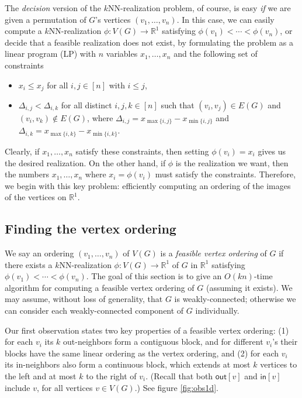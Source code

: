 \documentclass[english]{lipics-v2021}
\begin{document}
The \emph{decision} version of the $k$NN-realization problem, of course, is easy \emph{if} we are given a permutation of $G$'s vertices $(v_1,\dots,v_n)$. In this case, we can easily compute a $k$NN-realization $\phi: V(G) \rightarrow \mathbb{R}^1$ satisfying $\phi(v_1) < \cdots < \phi(v_n)$, or decide that a feasible realization does not exist, by formulating the  problem as a linear program (LP) with $n$ variables $x_1,\dots,x_n$ and the following set of constraints
\begin{itemize}
    \item $x_i \leq x_j$ for all $i,j \in [n]$ with $i \leq j$,
    \item $\Delta_{i,j} < \Delta_{i,k}$ for all distinct $i,j,k \in [n]$ such that $(v_i,v_j) \in E(G)$ and $(v_i,v_k) \notin E(G)$, where $\Delta_{i,j} = x_{\max\{i,j\}} - x_{\min\{i,j\}}$ and $\Delta_{i,k} = x_{\max\{i,k\}} - x_{\min\{i,k\}}$.
\end{itemize}
%
Clearly, if $x_1,\dots,x_n$ satisfy these constraints, then setting $\phi(v_i) = x_i$ gives us the desired realization.
On the other hand, if $\phi$ is the realization we want, then the numbers $x_1,\dots,x_n$ where $x_i = \phi(v_i)$ must satisfy the constraints.
Therefore, we begin with this key problem: efficiently computing an ordering of the images of the vertices on $\mathbb{R}^1$.

\subsection{Finding the vertex ordering}

We say an ordering $(v_1,\dots,v_n)$ of $V(G)$ is a \textit{feasible vertex ordering} of $G$ if there exists a $k$NN-realization $\phi: V(G) \rightarrow \mathbb{R}^1$ of $G$ in $\mathbb{R}^1$ satisfying $\phi(v_1) < \cdots < \phi(v_n)$.
The goal of this section is to give an $O(kn)$-time algorithm for computing a feasible vertex ordering of $G$ (assuming it exists).
We may assume, without loss of generality, that $G$ is weakly-connected; otherwise we can consider each weakly-connected component of $G$ individually. 

Our first observation states two key properties of a feasible vertex ordering: (1) for each $v_i$ its $k$ out-neighbors form a contiguous block, and for different $v_i$'s their blocks have the same linear ordering as the vertex ordering, and (2) for each $v_i$ its in-neighbors also form a continuous block, which extends at most $k$ vertices to the left and at most $k$ to the right of $v_i$. (Recall that both $\mathsf{out}[v]$ and $\mathsf{in}[v]$ include $v$, for all vertices $v \in V(G)$.) See figure \ref{fig:obs1d}.
\end{document}
